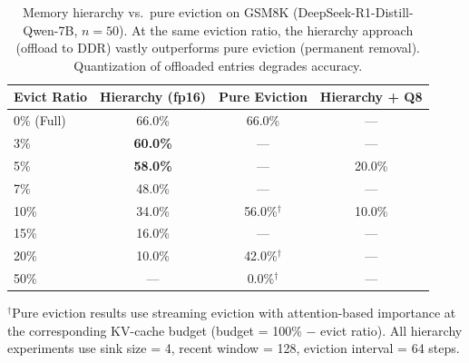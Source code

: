 \begin{table}[t]
\centering
\caption{Memory hierarchy vs.\ pure eviction on GSM8K (DeepSeek-R1-Distill-Qwen-7B, $n=50$).
At the same eviction ratio, the hierarchy approach (offload to DDR) vastly outperforms
pure eviction (permanent removal). Quantization of offloaded entries degrades accuracy.}
\label{tab:hierarchy}
\vskip 0.1in
\begin{tabular}{lccc}
\toprule
\textbf{Evict Ratio} & \textbf{Hierarchy (fp16)} & \textbf{Pure Eviction} & \textbf{Hierarchy + Q8} \\
\midrule
0\% (Full)  & 66.0\% & 66.0\% & --- \\
3\%         & \textbf{60.0\%} & --- & --- \\
5\%         & \textbf{58.0\%} & --- & 20.0\% \\
7\%         & 48.0\% & --- & --- \\
10\%        & 34.0\% & 56.0\%$^\dagger$ & 10.0\% \\
15\%        & 16.0\% & --- & --- \\
20\%        & 10.0\% & 42.0\%$^\dagger$ & --- \\
50\%        & --- & 0.0\%$^\dagger$ & --- \\
\bottomrule
\end{tabular}
\vskip 0.05in
\begin{minipage}{0.92\linewidth}
\small
$^\dagger$Pure eviction results use streaming eviction with attention-based importance at the corresponding KV-cache budget (budget = 100\% $-$ evict ratio).
All hierarchy experiments use sink size = 4, recent window = 128, eviction interval = 64 steps.
\end{minipage}
\end{table}